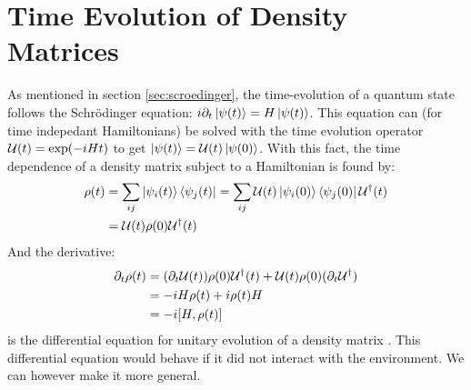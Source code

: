 \section{Time Evolution of Density Matrices} \label{sec: Time Evolution}
As mentioned in section \ref{sec:scroedinger}, the time-evolution of a quantum state follows the Schrödinger equation: $i\partial_t\ket{\psi(t)} = H\ket{\psi(t)}$. This equation can (for time indepedant Hamiltonians) be solved with the time evolution operator $\mathcal{U}(t) = \exp(-iHt)$ to get $\ket{\psi(t)} = \mathcal{U}(t)\ket{\psi(0)}$. With this fact, the time dependence of a density matrix subject to a Hamiltonian is found by:
\begin{align}
    \rho(t) &= \sum_{ij} \ket{\psi_i(t)}\bra{\psi_j(t)} = \sum_{ij} \mathcal{U}(t) \ket{\psi_i(0)}\bra{\psi_j(0)} \mathcal{U}^\dagger(t) \nonumber \\
    &= \mathcal{U}(t) \rho(0) \mathcal{U}^\dagger(t)
\end{align}
And the derivative:
\begin{align}
    \partial_t \rho(t) &= (\partial_t \unitary(t)) \rho(0)\unitary^\dagger(t) + \unitary(t)\rho(0)(\partial_t \unitary^\dagger) \nonumber \\
    &= -iH \rho(t) +i \rho(t) H \nonumber \\
    &= - i \comm{H}{\rho(t)}
\end{align}
is the differential equation for unitary evolution of a density matrix \cite{manzano_short_2020}. This differential equation would behave if it did not interact with the environment. We can however make it more general.

